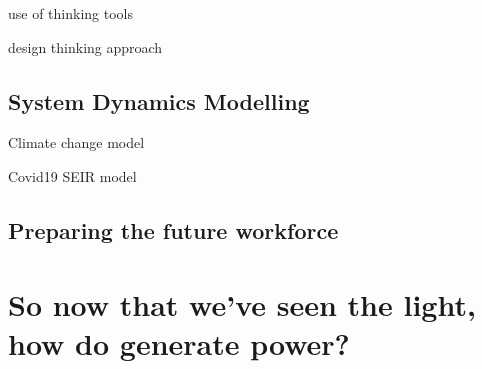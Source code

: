 use of thinking tools

design thinking approach



\subsection*{System Dynamics Modelling}
Climate change model

Covid19 SEIR model


\subsection*{Preparing the future workforce}


\section{So now that we've seen the light, how do generate power?}
